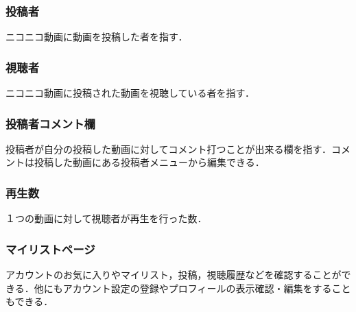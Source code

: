 \subsubsection*{投稿者}
ニコニコ動画に動画を投稿した者を指す．　

\subsubsection*{視聴者}
ニコニコ動画に投稿された動画を視聴している者を指す．

\subsubsection*{投稿者コメント欄}
投稿者が自分の投稿した動画に対してコメント打つことが出来る欄を指す．コメントは投稿した動画にある投稿者メニューから編集できる．

\subsubsection*{再生数}
１つの動画に対して視聴者が再生を行った数．

\subsubsection*{マイリストページ}
アカウントのお気に入りやマイリスト，投稿，視聴履歴などを確認することができる．他にもアカウント設定の登録やプロフィールの表示確認・編集をすることもできる．

